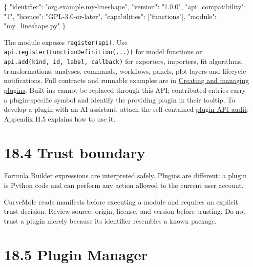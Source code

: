 \documentclass[
  10pt,
  a4paper,
  oneside]{scrreprt}
\newenvironment{Shaded}{}{}
\newcommand{\DataTypeTok}[1]{\textcolor[rgb]{0.56,0.13,0.00}{#1}}
\newcommand{\FunctionTok}[1]{\textcolor[rgb]{0.02,0.16,0.49}{#1}}
\newcommand{\OtherTok}[1]{\textcolor[rgb]{0.00,0.44,0.13}{#1}}
\newcommand{\StringTok}[1]{\textcolor[rgb]{0.25,0.44,0.63}{#1}}
\begin{document}
\begin{Shaded}
\begin{Highlighting}[]
\FunctionTok{\{}
  \DataTypeTok{"identifier"}\FunctionTok{:} \StringTok{"org.example.my{-}lineshape"}\FunctionTok{,}
  \DataTypeTok{"version"}\FunctionTok{:} \StringTok{"1.0.0"}\FunctionTok{,}
  \DataTypeTok{"api\_compatibility"}\FunctionTok{:} \StringTok{"1"}\FunctionTok{,}
  \DataTypeTok{"licence"}\FunctionTok{:} \StringTok{"GPL{-}3.0{-}or{-}later"}\FunctionTok{,}
  \DataTypeTok{"capabilities"}\FunctionTok{:} \OtherTok{[}\StringTok{"functions"}\OtherTok{]}\FunctionTok{,}
  \DataTypeTok{"module"}\FunctionTok{:} \StringTok{"my\_lineshape.py"}
\FunctionTok{\}}
\end{Highlighting}
\end{Shaded}

The module exposes \texttt{register(api)}. Use
\texttt{api.register(FunctionDefinition(...))} for model functions or
\texttt{api.add(kind,\ id,\ label,\ callback)} for exporters, importers,
fit algorithms, transformations, analyses, commands, workflows, panels,
plot layers and lifecycle notifications. Full contracts and runnable
examples are in \href{plugins.md}{Creating and managing plugins}.
Built-ins cannot be replaced through this API; contributed entries carry
a plugin-specific symbol and identify the providing plugin in their
tooltip. To develop a plugin with an AI assistant, attach the
self-contained \href{ai-plugin-audit.md}{plugin API audit}; Appendix H.5
explains how to use it.

\hypertarget{trust-boundary}{%
\section{18.4 Trust boundary}\label{trust-boundary}}

Formula Builder expressions are interpreted safely. Plugins are
different: a plugin is Python code and can perform any action allowed to
the current user account.

CurveMole reads manifests before executing a module and requires an
explicit trust decision. Review source, origin, license, and version
before trusting. Do not trust a plugin merely because its identifier
resembles a known package.

\hypertarget{plugin-manager}{%
\section{18.5 Plugin Manager}\label{plugin-manager}}
\end{document}
